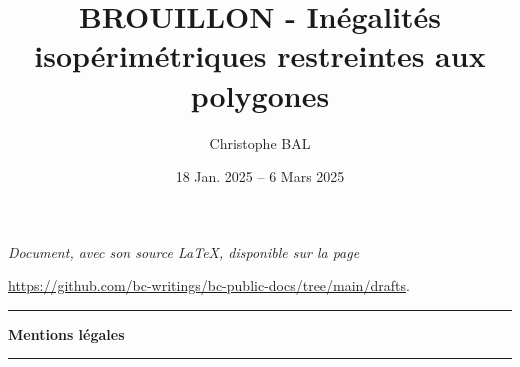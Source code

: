 \documentclass[12pt]{amsart}
\begin{document}
\title{BROUILLON - Inégalités isopérimétriques restreintes aux polygones}
\author{Christophe BAL}
\date{18 Jan. 2025 -- 6 Mars 2025}

\maketitle

\begin{center}
	\itshape
	Document, avec son source \LaTeX, disponible sur la page

	\url{https://github.com/bc-writings/bc-public-docs/tree/main/drafts}.
\end{center}


\bigskip


\begin{center}
	\hrule\vspace{.3em}
	{
		\fontsize{1.35em}{1em}\selectfont
		\textbf{Mentions \og légales \fg}
	}

	\vspace{0.45em}
	\doclicenseThis
	\hrule
\end{center}



\setcounter{tocdepth}{2}
\tableofcontents




\newpage
\end{document}
